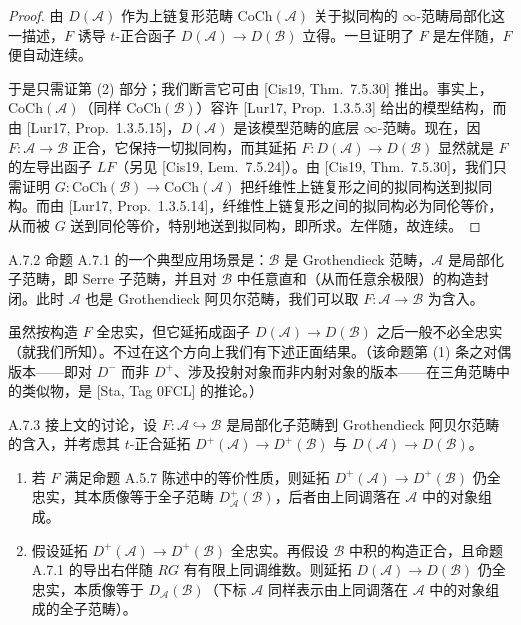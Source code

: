 
\begin{proof}
由 $D(\mathcal A)$ 作为上链复形范畴 $\mathrm{CoCh}(\mathcal A)$ 关于拟同构的 $\infty$-范畴局部化这一描述，$F$ 诱导 $t$-正合函子 $D(\mathcal A)\to D(\mathcal B)$ 立得。一旦证明了 $F$ 是左伴随，$F$ 便自动连续。

于是只需证第 \textup{(2)} 部分；我们断言它可由 [Cis19, Thm.~7.5.30] 推出。事实上，$\mathrm{CoCh}(\mathcal A)$（同样 $\mathrm{CoCh}(\mathcal B)$）容许 [Lur17, Prop.~1.3.5.3] 给出的模型结构，而由 [Lur17, Prop.~1.3.5.15]，$D(\mathcal A)$ 是该模型范畴的底层 $\infty$-范畴。现在，因 $F:\mathcal A\to\mathcal B$ 正合，它保持一切拟同构，而其延拓 $F:D(\mathcal A)\to D(\mathcal B)$ 显然就是 $F$ 的左导出函子 $LF$（另见 [Cis19, Lem.~7.5.24]）。由 [Cis19, Thm.~7.5.30]，我们只需证明 $G:\mathrm{CoCh}(\mathcal B)\to\mathrm{CoCh}(\mathcal A)$ 把纤维性上链复形之间的拟同构送到拟同构。而由 [Lur17, Prop.~1.3.5.14]，纤维性上链复形之间的拟同构必为同伦等价，从而被 $G$ 送到同伦等价，特别地送到拟同构，即所求。左伴随，故连续。
\end{proof}

\begin{exam}{A.7.2}\label{exam:a4-17-A-7-2}
命题 A.7.1 的一个典型应用场景是：$\mathcal B$ 是 Grothendieck 范畴，$\mathcal A$ 是局部化子范畴，即 Serre 子范畴，并且对 $\mathcal B$ 中任意直和（从而任意余极限）的构造封闭。此时 $\mathcal A$ 也是 Grothendieck 阿贝尔范畴，我们可以取 $F:\mathcal A\to\mathcal B$ 为含入。

虽然按构造 $F$ 全忠实，但它延拓成函子 $D(\mathcal A)\to D(\mathcal B)$ 之后一般不必全忠实（就我们所知）。不过在这个方向上我们有下述正面结果。（该命题第 \textup{(1)} 条之对偶版本——即对 $D^-$ 而非 $D^+$、涉及投射对象而非内射对象的版本——在三角范畴中的类似物，是 [Sta, Tag 0FCL] 的推论。）
\end{exam}

\begin{prop}{A.7.3}\label{prop:a4-17-A-7-3}
接上文的讨论，设 $F:\mathcal A\hookrightarrow\mathcal B$ 是局部化子范畴到 Grothendieck 阿贝尔范畴的含入，并考虑其 $t$-正合延拓 $D^+(\mathcal A)\to D^+(\mathcal B)$ 与 $D(\mathcal A)\to D(\mathcal B)$。
\begin{enumerate}[label=(\arabic*)]
\item 若 $F$ 满足命题 A.5.7 陈述中的等价性质，则延拓 $D^+(\mathcal A)\to D^+(\mathcal B)$ 仍全忠实，其本质像等于全子范畴 $D^+_{\mathcal A}(\mathcal B)$，后者由上同调落在 $\mathcal A$ 中的对象组成。
\item 假设延拓 $D^+(\mathcal A)\to D^+(\mathcal B)$ 全忠实。再假设 $\mathcal B$ 中积的构造正合，且命题 A.7.1 的导出右伴随 $RG$ 有有限上同调维数。则延拓 $D(\mathcal A)\to D(\mathcal B)$ 仍全忠实，本质像等于 $D_{\mathcal A}(\mathcal B)$（下标 $\mathcal A$ 同样表示由上同调落在 $\mathcal A$ 中的对象组成的全子范畴）。
\end{enumerate}
\end{prop}

